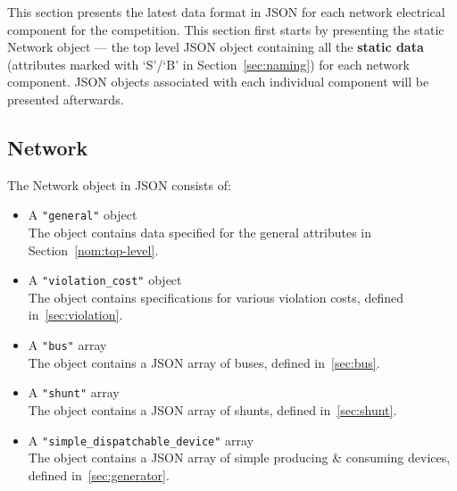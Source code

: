 This section presents the latest data format in JSON for 
each network electrical component for the competition.
This section first starts by presenting the static Network object ---
the top level JSON object containing all the \textbf{static data}
(attributes marked with `S'/`B' in Section~\ref{sec:naming}) for each network component.
JSON objects associated with each individual component will be presented afterwards.

\subsection{Network}
\label{sec:network}
The Network object in JSON consists of: 
\begin{itemize}
    \item A \texttt{"general"} object\\
    The object contains data specified for the general attributes in Section~\ref{nom:top-level}.
    \item A \texttt{"violation\_cost"} object\\
    The object contains specifications for various violation costs, defined in~\ref{sec:violation}.
    \item A \texttt{"bus"} array\\
    The object contains a JSON array of buses, defined in~\ref{sec:bus}.
    \item A \texttt{"shunt"} array\\
    The object contains a JSON array of shunts, defined in~\ref{sec:shunt}.
    \item A \texttt{"simple\_dispatchable\_device"} array\\
    The object contains a JSON array of simple producing \& consuming devices, defined in~\ref{sec:generator}.

\end{itemize}
